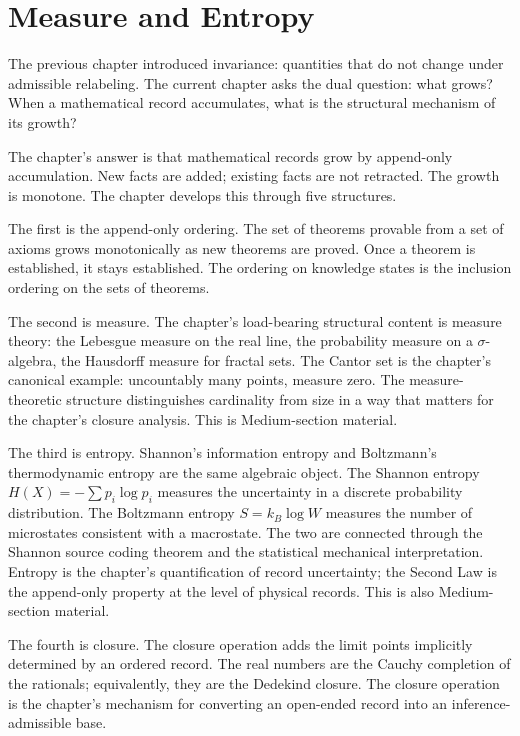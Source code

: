 \chapter{Measure and Entropy}
\label{chap:measure-and-entropy}


\begin{chapteressay}

The previous chapter introduced invariance: quantities that do not
change under admissible relabeling. The current chapter asks the
dual question: what grows? When a mathematical record accumulates,
what is the structural mechanism of its growth?

The chapter's answer is that mathematical records grow by
append-only accumulation. New facts are added; existing facts are
not retracted. The growth is monotone. The chapter develops this
through five structures.

The first is the append-only ordering. The set of theorems
provable from a set of axioms grows monotonically as new theorems
are proved. Once a theorem is established, it stays established.
The ordering on knowledge states is the inclusion ordering on the
sets of theorems.

The second is measure. The chapter's load-bearing structural
content is measure theory: the Lebesgue measure on the real line,
the probability measure on a $\sigma$-algebra, the Hausdorff
measure for fractal sets. The Cantor set is the chapter's
canonical example: uncountably many points, measure zero. The
measure-theoretic structure distinguishes cardinality from size in
a way that matters for the chapter's closure analysis. This is
Medium-section material.

The third is entropy. Shannon's information entropy and
Boltzmann's thermodynamic entropy are the same algebraic object.
The Shannon entropy $H(X) = -\sum p_i \log p_i$ measures the
uncertainty in a discrete probability distribution. The Boltzmann
entropy $S = k_B \log W$ measures the number of microstates
consistent with a macrostate. The two are connected through the
Shannon source coding theorem and the statistical mechanical
interpretation. Entropy is the chapter's quantification of
record uncertainty; the Second Law is the append-only property
at the level of physical records. This is also Medium-section
material.

The fourth is closure. The closure operation adds the limit points
implicitly determined by an ordered record. The real numbers are
the Cauchy completion of the rationals; equivalently, they are
the Dedekind closure. The closure operation is the chapter's
mechanism for converting an open-ended record into an
inference-admissible base.


\end{chapteressay}
